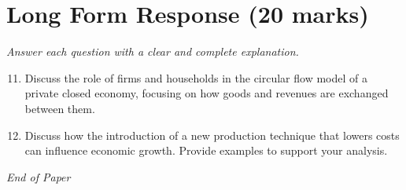 \documentclass[12pt]{article}
\begin{document}
\section*{Long Form Response (20 marks)}
\textit{Answer each question with a clear and complete explanation.}
\begin{enumerate}[label=\arabic*.]
\setcounter{enumi}{10}
\item Discuss the role of firms and households in the circular flow model of a private closed economy, focusing on how goods and revenues are exchanged between them.
\item Discuss how the introduction of a new production technique that lowers costs can influence economic growth. Provide examples to support your analysis.
\end{enumerate}

\vfill
\noindent\textit{End of Paper}
\end{document}
